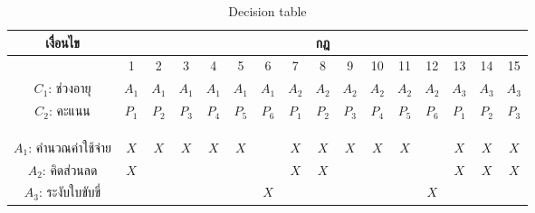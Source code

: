 \documentclass[12pt,a4paper]{report}
\begin{document}
\begin{landscape}
    \begin{table}
        \centering
        \caption{Decision table}
        \label{desct}
        \begin{tabular}{|c||c|c|c|c|c|c|c|c|c|c|c|c|c|c|c|}
            \hline
            เงื่อนไข & \multicolumn{15}{c|}{กฎ} \\ \hline \hline
                                &  1    &  2    &  3    &  4    &  5    &  6    &  7    &  8    &  9    &  10   &  11   &  12   &  13   &   14  &  15     \\ 
             $C_1$: ช่วงอายุ      & $A_1$ & $A_1$ & $A_1$ & $A_1$ & $A_1$ & $A_1$ & $A_2$ & $A_2$ & $A_2$ & $A_2$ & $A_2$ & $A_2$ & $A_3$ & $A_3$ & $A_3$   \\
             $C_2$: คะแนน       & $P_1$ & $P_2$ & $P_3$ & $P_4$ & $P_5$ & $P_6$ & $P_1$ & $P_2$ & $P_3$ & $P_4$ & $P_5$ & $P_6$ & $P_1$ & $P_2$ & $P_3$   \\ 
                                &       &       &       &       &       &       &       &       &       &       &       &       &       &       &         \\ 
                                &       &       &       &       &       &       &       &       &       &       &       &       &       &       &         \\ \hline
                                &       &       &       &       &       &       &       &       &       &       &       &       &       &       &         \\ 
            $A_1$: คำนวณค่าใช้จ่าย & $X$   & $X$   & $X$   & $X$   & $X$   &       & $X$   & $X$   & $X$   & $X$   & $X$   &       & $X$   & $X$   & $X$     \\ 
            $A_2$: คิดส่วนลด      & $X$   &       &       &       &       &       & $X$   & $X$   &       &       &       &       & $X$   & $X$   & $X$     \\ 
            $A_3$: ระงับใบขับขี่    &       &       &       &       &       & $X$   &       &       &       &       &       & $X$   &       &       &         \\ \hline 

        \end{tabular}
    \end{table}

\end{landscape}

\newpage
\end{document}
